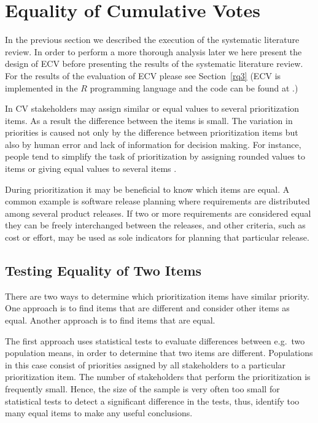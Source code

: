 \section{Equality of Cumulative Votes \label{ecv}}
In the previous section we described the execution of the systematic literature review. In order to perform a more thorough analysis later we here present the design of ECV before presenting the results of the systematic literature review. For the results of the evaluation of ECV please see Section~\ref{rq3} (ECV is implemented in the $R$ programming language \citep{Ihaka1996} and the code can be found at \citep{Rinkevics2011}.)

In CV stakeholders may assign similar or equal values to several prioritization items. As a result the difference between the items is small. The variation in priorities is caused not only by the difference between prioritization items but also by human error and lack of information for decision making. For instance, people tend to simplify the task of prioritization by assigning rounded values to items or giving equal values to several items \citep{Groves2009}.

During prioritization it may be beneficial to know which items are equal. A common example is software release planning where requirements are distributed among several product releases. If two or more requirements are considered equal they can be freely interchanged between the releases, and other criteria, such as cost or effort, may be used as sole indicators for planning that particular release.

\subsection{\label{Testing-Equality-of}Testing Equality of Two Items}
There are two ways to determine which prioritization items have similar priority.
One approach is to find items that are different and consider other items as equal.
Another approach is to find items that are equal.

The first approach uses statistical tests to evaluate differences between e.g.\ two population means, in order to determine that two items are different.
Populations in this case consist of priorities assigned by all stakeholders to a particular prioritization item.
The number of stakeholders that perform the prioritization is frequently small.
Hence, the size of the sample is very often too small for statistical tests to detect a significant difference in the tests, thus, identify too many equal items to make any useful conclusions.

